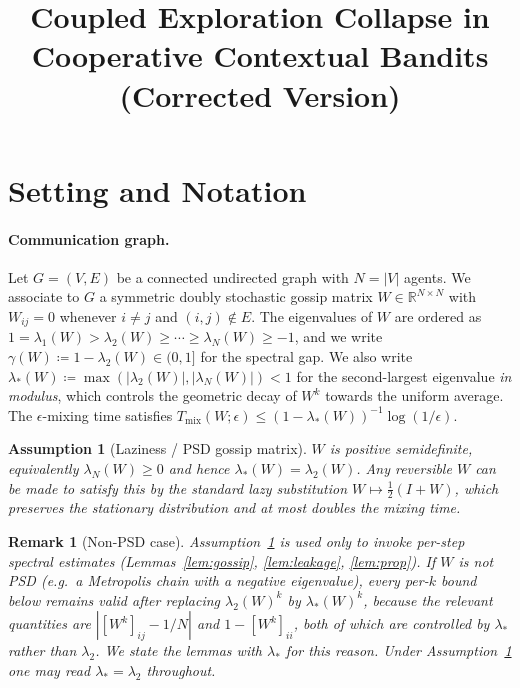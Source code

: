 \documentclass[11pt]{article}
\title{Coupled Exploration Collapse in Cooperative Contextual Bandits\\
\large (Corrected Version)}
\author{}
\date{}
\newtheorem{assumption}[theorem]{Assumption}
\newtheorem*{remark}{Remark}
\begin{document}
\maketitle
\tableofcontents
\newpage

\section{Setting and Notation}\label{sec:setting}

\paragraph{Communication graph.}
Let $G=(V,E)$ be a connected undirected graph with $N=|V|$ agents.
We associate to $G$ a symmetric doubly stochastic gossip matrix
$W\in\mathbb{R}^{N\times N}$ with $W_{ij}=0$ whenever $i\neq j$
and $(i,j)\notin E$.  The eigenvalues of $W$ are ordered as
$1=\lambda_1(W)>\lambda_2(W)\geq\cdots\geq\lambda_N(W)\geq -1$,
and we write $\gamma(W)\coloneqq 1-\lambda_2(W)\in(0,1]$ for the
spectral gap.  We also write
$\lambda_*(W)\coloneqq\max(|\lambda_2(W)|,|\lambda_N(W)|)<1$
for the second-largest eigenvalue \emph{in modulus}, which controls
the geometric decay of $W^k$ towards the uniform average.
The $\epsilon$-mixing time satisfies
$T_{\mathrm{mix}}(W;\epsilon)\leq(1-\lambda_*(W))^{-1}\log(1/\epsilon)$.

\begin{assumption}[Laziness / PSD gossip matrix]\label{ass:lazy}
$W$ is positive semidefinite, equivalently $\lambda_N(W)\geq 0$ and
hence $\lambda_*(W)=\lambda_2(W)$.  Any reversible $W$ can be made to
satisfy this by the standard lazy substitution
$W\mapsto\tfrac12(I+W)$, which preserves the stationary distribution
and at most doubles the mixing time.
\end{assumption}

\begin{remark}[Non-PSD case]\label{rem:lazy}
Assumption~\ref{ass:lazy} is used only to invoke per-step spectral
estimates (Lemmas~\ref{lem:gossip}, \ref{lem:leakage},
\ref{lem:prop}).  If $W$ is \emph{not} PSD (e.g.\ a Metropolis chain
with a negative eigenvalue), every per-$k$ bound below remains valid
after replacing $\lambda_2(W)^k$ by $\lambda_*(W)^k$, because
the relevant quantities are $|[W^k]_{ij}-1/N|$ and
$1-[W^k]_{ii}$, both of which are controlled by $\lambda_*$ rather
than $\lambda_2$.  We state the lemmas with $\lambda_*$ for this
reason. Under Assumption~\ref{ass:lazy} one may read
$\lambda_*=\lambda_2$ throughout.
\end{remark}
\end{document}

